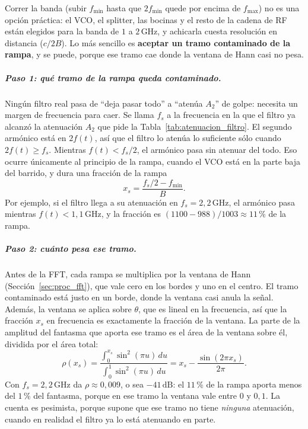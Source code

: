 \documentclass[12pt, a4paper, twoside]{report}
\begin{document}
Correr la banda (subir $f_\text{min}$ hasta que $2f_\text{min}$ quede por
encima de $f_\text{max}$) no es una opción práctica: el VCO, el splitter,
las bocinas y el resto de la cadena de RF están elegidos para la banda de
$1$ a $2\,\text{GHz}$, y achicarla cuesta resolución en distancia ($c/2B$).
Lo más sencillo es \textbf{aceptar un tramo contaminado de la rampa}, y se
puede, porque ese tramo cae donde la ventana de Hann casi no pesa.

\subparagraph{Paso 1: qué tramo de la rampa queda contaminado.} Ningún
filtro real pasa de ``deja pasar todo'' a ``atenúa $A_2$'' de golpe: necesita
un margen de frecuencia para caer. Se llama $f_s$ a la frecuencia en la que el
filtro ya alcanzó la atenuación $A_2$ que pide la
Tabla~\ref{tab:atenuacion_filtro}. El segundo armónico está en $2f(t)$, así
que el filtro lo atenúa lo suficiente sólo cuando $2f(t) \geq f_s$. Mientras
$f(t) < f_s/2$, el armónico pasa sin atenuar del todo. Eso ocurre únicamente
al principio de la rampa, cuando el VCO está en la parte baja del barrido, y
dura una fracción de la rampa
\begin{equation}
  x_s = \frac{f_s/2 - f_\text{min}}{B}.
\end{equation}
Por ejemplo, si el filtro llega a su atenuación en $f_s = 2{,}2\,\text{GHz}$,
el armónico pasa mientras $f(t) < 1{,}1\,\text{GHz}$, y la fracción es
$(1100 - 988)/1003 \approx 11$\,\% de la rampa.

\subparagraph{Paso 2: cuánto pesa ese tramo.} Antes de la FFT, cada rampa
se multiplica por la ventana de Hann (Sección~\ref{sec:proc_fft}), que vale
cero en los bordes y uno en el centro. El tramo contaminado está justo en un
borde, donde la ventana casi anula la señal. Además, la ventana se aplica
sobre $\theta$, que es lineal en la frecuencia, así que la fracción $x_s$ en
frecuencia es exactamente la fracción de la ventana. La parte de la amplitud
del fantasma que aporta ese tramo es el área de la ventana sobre él,
dividida por el área total:
\begin{equation}
  \rho(x_s) = \frac{\int_0^{x_s} \sin^2(\pi u)\,du}{\int_0^{1}
  \sin^2(\pi u)\,du} = x_s - \frac{\sin(2\pi x_s)}{2\pi}.
\end{equation}
Con $f_s = 2{,}2\,\text{GHz}$ da $\rho \approx 0{,}009$, o sea
$-41\,\text{dB}$: el $11$\,\% de la rampa aporta menos del $1$\,\% del
fantasma, porque en ese tramo la ventana vale entre $0$ y $0{,}1$. La cuenta
es pesimista, porque supone que ese tramo no tiene \emph{ninguna}
atenuación, cuando en realidad el filtro ya lo está atenuando en parte.
\end{document}
